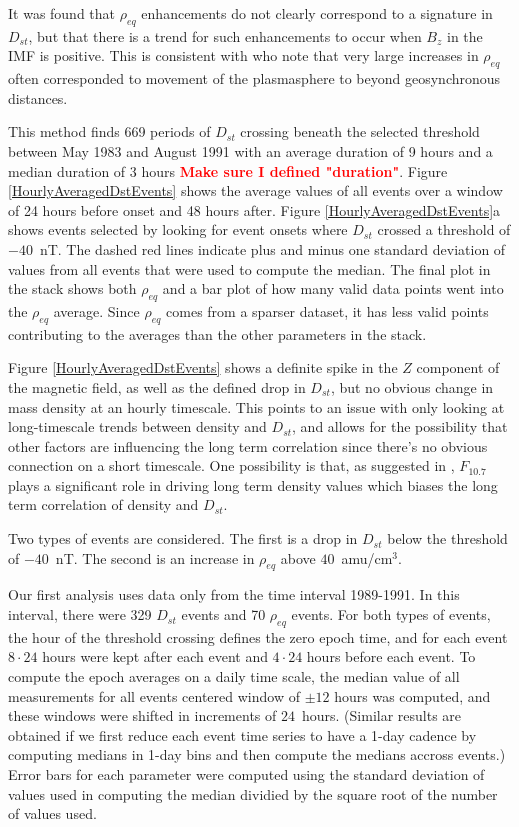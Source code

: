 \documentclass[10pt,twocolumn]{article}
\newcommand{\vinote}[1]{\textcolor{red}{\textbf{#1}}} %
\newcommand{\inote}[1]{\textcolor{blue}{\textbf{#1}}} %
\def\note#1\par{\textcolor{blue}{\textbf{#1}}\\}
\begin{document}
It was found that $\rho_{eq}$ enhancements do not clearly correspond to a signature in $D_{st}$, but that there is a trend for such enhancements to occur when $B_{z}$ in the IMF is positive.  This is consistent with \cite{Takahashi2010} who note that very large increases in $\rho_{eq}$ often corresponded to movement of the plasmasphere to beyond geosynchronous distances. 

This method finds 669 periods of $D_{st}$ crossing beneath the selected threshold between May 1983 and August 1991 with an average duration of 9 hours and a median duration of 3 hours \vinote{Make sure I defined "duration"}. Figure \ref{HourlyAveragedDstEvents} shows the average values of all events over a window of 24 hours before onset and 48 hours after. Figure \ref{HourlyAveragedDstEvents}a shows events selected by looking for event onsets where $D_{st}$ crossed a threshold of $-40$~nT. The dashed red lines indicate plus and minus one standard deviation of values from all events that were used to compute the median. The final plot in the stack shows both $\rho_{eq}$ and a bar plot of how many valid data points went into the $\rho_{eq}$ average. Since $\rho_{eq}$ comes from a sparser dataset, it has less valid points contributing to the averages than the other parameters in the stack. 

Figure \ref{HourlyAveragedDstEvents} shows a definite spike in the $Z$ component of the magnetic field, as well as the defined drop in $D_{st}$, but no obvious change in mass density at an hourly timescale. This points to an issue with only looking at long-timescale trends between density and $D_{st}$, and allows for the possibility that other factors are influencing the long term correlation since there's no obvious connection on a short timescale. One possibility is that, as suggested in \cite{Takahashi2010}, $F_{10.7}$ plays a significant role in driving long term density values which biases the long term correlation of density and $D_{st}$.

Two types of events are considered. The first is a drop in $D_{st}$ below the threshold of $-40$~nT.  The second is an increase in $\rho_{eq}$ above $40$~amu/cm$^3$.

Our first analysis uses data only from the time interval 1989-1991.  In this interval, there were 329 $D_{st}$ events and 70 $\rho_{eq}$ events.  For both types of events, the hour of the threshold crossing defines the zero epoch time, and for each event $8\cdot24$ hours were kept after each event and $4\cdot24$ hours before each event.  To compute the epoch averages on a daily time scale, the median value of all measurements for all events centered window of $\pm 12$ hours was computed, and these windows were shifted in increments of $24$~hours. (Similar results are obtained if we first reduce each event time series to have a 1-day cadence by computing medians in 1-day bins and then compute the medians accross events.)  Error bars for each parameter were computed using the standard deviation of values used in computing the median dividied by the square root of the number of values used.
\end{document}

